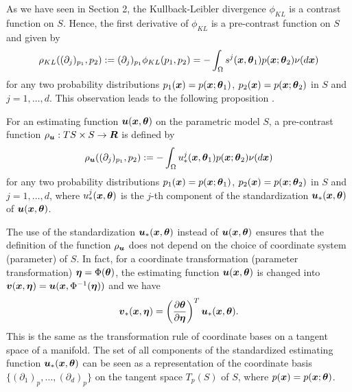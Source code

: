 \documentclass[graybox]{svmult}
\newcommand{\bm}[1]{\mbox{\boldmath $#1$}}
\newcommand{\bms}[1]{\mbox{\scriptsize\boldmath $#1$}}
\begin{document}
As we have seen in Section 2, the Kullback-Leibler divergence $\phi_{KL}$ is a contrast 
function on $S$. Hence, the first derivative of $\phi_{KL}$ is a pre-contrast function on 
$S$ and given by
%
\begin{eqnarray*}\label{preKL}
   \rho_{KL}((\partial_j)_{p_1},p_2) 
   := (\partial_j)_{p_1}\phi_{KL}(p_1,p_2)
    = - \int_{\Omega}s^{j}(\bm{x},\bm{\theta}_1)p(\bm{x};\bm{\theta}_2)\nu(d\bm{x})
\end{eqnarray*}
%
for any two probability distributions $p_1(\bm{x})=p(\bm{x};\bm{\theta}_1)$,
$p_2(\bm{x})=p(\bm{x};\bm{\theta}_2)$ in $S$ and $j=1,\ldots,d$.
This observation leads to the following proposition \cite{HM}.
%
\begin{proposition}
   For an estimating function $\bm{u}(\bm{x},\bm{\theta})$ on the parametric model $S$,
   a pre-contrast function $\rho_{\bms{u}}:TS \times S \rightarrow \bm{R}$ is defined by
%
   \begin{eqnarray}\label{preest}
      \rho_{\bms{u}}((\partial_j)_{p_1},p_2) := 
      - \int_{\Omega}u_{\ast}^j(\bm{x},\bm{\theta}_1)p(\bm{x};\bm{\theta}_2)\nu(d\bm{x})
   \end{eqnarray}
%
   for any two probability distributions $p_1(\bm{x})=p(\bm{x};\bm{\theta}_1)$,
   $p_2(\bm{x})=p(\bm{x};\bm{\theta}_2)$ in $S$ and $j=1,\ldots,d$, where
   $u_{\ast}^j(\bm{x},\bm{\theta})$ is the $j$-th component of the standardization
   $\bm{u}_{\ast}(\bm{x},\bm{\theta})$ of $\bm{u}(\bm{x},\bm{\theta})$.
\end{proposition}
%
The use of the standardization $\bm{u}_{\ast}(\bm{x},\bm{\theta})$ instead of
$\bm{u}(\bm{x},\bm{\theta})$ ensures that the definition of the function $\rho_{\bms{u}}$
does not depend on the choice of coordinate system (parameter) of $S$.
In fact, for a coordinate transformation (parameter transformation) 
$\bm{\eta}=\Phi(\bm{\theta})$, the estimating function $\bm{u}(\bm{x},\bm{\theta})$ is
changed into $\bm{v}(\bm{x},\bm{\eta})=\bm{u}(\bm{x},\Phi^{-1}(\bm{\eta}))$ and we have
%
\begin{eqnarray*}
   \bm{v}_{\ast}(\bm{x},\bm{\eta}) = \left(\frac{\partial\bm{\theta}}{\partial\bm{\eta}}\right)^T
                                     \bm{u}_{\ast}(\bm{x},\bm{\theta}).
\end{eqnarray*}
%
This is the same as the transformation rule of coordinate bases on a tangent space of a
manifold. The set of all components of the standardized estimating function
$\bm{u}_{\ast}(\bm{x},\bm{\theta})$ can be seen as a representation of the coordinate 
basis $\{(\partial_1)_p,\ldots,(\partial_d)_p\}$ on the tangent space $T_p(S)$ of $S$,
where $p(\bm{x})=p(\bm{x};\bm{\theta})$.
\end{document}

